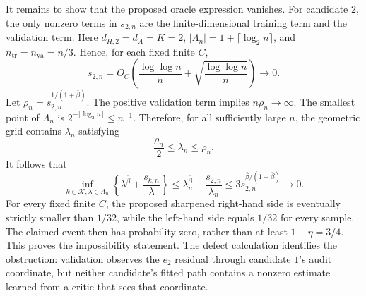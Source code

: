 It remains to show that the proposed oracle expression vanishes. For candidate \(2\), the only nonzero terms in \(s_{2,n}\) are the finite-dimensional training term and the validation term. Here \(d_{H,2}=d_A=K=2\), \(|\Lambda_n|=1+\lceil\log_2 n\rceil\), and \(n_{\mathrm{tr}}=n_{\mathrm{va}}=n/3\). Hence, for each fixed finite \(C\),
\[
 s_{2,n}
 =O_C\!\left(
 \frac{\log\log n}{n}
 +\sqrt{\frac{\log\log n}{n}}
 \right)
 \longrightarrow0.
\]
Let \(\rho_n=s_{2,n}^{1/(1+\bar\beta)}\). The positive validation term implies \(n\rho_n\to\infty\). The smallest point of \(\Lambda_n\) is \(2^{-\lceil\log_2n\rceil}\le n^{-1}\). Therefore, for all sufficiently large \(n\), the geometric grid contains \(\lambda_n\) satisfying
\[
 \frac{\rho_n}{2}\le\lambda_n\le\rho_n.
\]
It follows that
\[
 \inf_{k\in\mathcal K,\lambda\in\Lambda_n}
 \left\{\lambda^{\bar\beta}+\frac{s_{k,n}}{\lambda}\right\}
 \le \lambda_n^{\bar\beta}+\frac{s_{2,n}}{\lambda_n}
 \le3s_{2,n}^{\bar\beta/(1+\bar\beta)}
 \longrightarrow0.
\]
For every fixed finite \(C\), the proposed sharpened right-hand side is eventually strictly smaller than \(1/32\), while the left-hand side equals \(1/32\) for every sample. The claimed event then has probability zero, rather than at least \(1-\eta=3/4\). This proves the impossibility statement. The defect calculation identifies the obstruction: validation observes the \(e_2\) residual through candidate \(1\)'s audit coordinate, but neither candidate's fitted path contains a nonzero estimate learned from a critic that sees that coordinate.